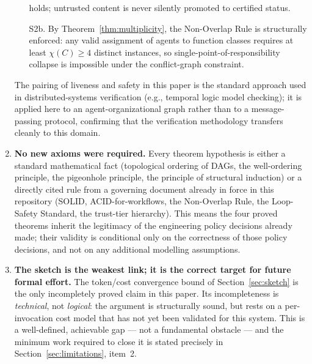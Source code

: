 \documentclass[12pt]{article}
\theoremstyle{definition}
\begin{document}
\begin{enumerate}
\begin{enumerate}
                          holds; untrusted content is never silently
                          promoted to certified status.
              \item[S2b.] By Theorem~\ref{thm:multiplicity}, the
                          Non-Overlap Rule is structurally enforced:
                          any valid assignment of agents to function
                          classes requires at least
                          $\chi(C) \geq 4$ distinct instances,
                          so single-point-of-responsibility collapse
                          is impossible under the conflict-graph
                          constraint.
          \end{enumerate}
          The pairing of liveness and safety in this paper is the
          standard approach used in distributed-systems verification
          (e.g., temporal logic model checking); it is applied here
          to an agent-organizational graph rather than to a
          message-passing protocol, confirming that the verification
          methodology transfers cleanly to this domain.

    \item \textbf{No new axioms were required.}
          Every theorem hypothesis is either a standard mathematical
          fact (topological ordering of DAGs, the well-ordering
          principle, the pigeonhole principle, the principle of
          structural induction) or a directly cited rule from a
          governing document already in force in this repository
          (SOLID, ACID-for-workflows, the Non-Overlap Rule, the
          Loop-Safety Standard, the trust-tier hierarchy).
          This means the four proved theorems inherit the legitimacy
          of the engineering policy decisions already made; their
          validity is conditional only on the correctness of those
          policy decisions, and not on any additional modelling
          assumptions.

    \item \textbf{The sketch is the weakest link; it is the correct
          target for future formal effort.}
          The token/cost convergence bound of Section~\ref{sec:sketch}
          is the only incompletely proved claim in this paper.  Its
          incompleteness is \emph{technical}, not \emph{logical}:
          the argument is structurally sound, but rests on a
          per-invocation cost model that has not yet been validated
          for this system.  This is a well-defined, achievable
          gap --- not a fundamental obstacle --- and the minimum work
          required to close it is stated precisely in
          Section~\ref{sec:limitations}, item~2.

\end{enumerate}
\end{document}
